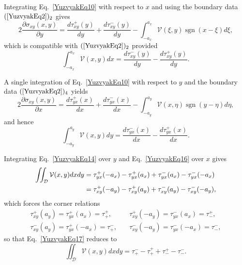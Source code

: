 Integrating Eq.~\eqref{YuzvyakEq10} with respect to \(x\) and using the
boundary data \((\ref{YuzvyakEq2})_2\) gives
\begin{equation}
	2\frac{\partial \sigma_{xy}(x,y)}{\partial y}=
	\frac{d\tau_{xy}^{+}(y)}{dy}+\frac{d\tau_{xy}^{-}(y)}{dy}
	-\int_{-a_x}^{a_x}\mathcal{V}(\xi,y) \operatorname{sgn}(x-\xi) d\xi ,
	\label{YuzvyakEq13}
\end{equation}
which is compatible with \((\ref{YuzvyakEq2})_2\) provided
\begin{equation}
	\int_{-a_x}^{a_x}\mathcal{V}(x,y) dx=
	\frac{d\tau_{xy}^{-}(y)}{dy}-\frac{d\tau_{xy}^{+}(y)}{dy}.
	\label{YuzvyakEq14}
\end{equation}

A single integration of Eq.~\eqref{YuzvyakEq10} with respect to \(y\) and
the boundary data \((\ref{YuzvyakEq2})_4\) yields
\begin{equation}
	2\frac{\partial \sigma_{xy}(x,y)}{\partial x}=
	\frac{d\tau_{yx}^{+}(x)}{dx}+\frac{d\tau_{yx}^{-}(x)}{dx}
	-\int_{-a_y}^{a_y}\mathcal{V}(x,\eta) \operatorname{sgn}(y-\eta) d\eta ,
	\label{YuzvyakEq15}
\end{equation}
and hence
\begin{equation}
	\int_{-a_y}^{a_y}\mathcal{V}(x,y) dy=
	\frac{d\tau_{yx}^{-}(x)}{dx}-\frac{d\tau_{yx}^{+}(x)}{dx}.
	\label{YuzvyakEq16}
\end{equation}

Integrating Eq.~\eqref{YuzvyakEq14} over \(y\) and Eq.~\eqref{YuzvyakEq16}
over \(x\) gives
\begin{align}
	\iint_{\mathcal{D}}\mathcal{V}(x,y) dx dy&=
	\tau_{yx}^{+}(-a_x)-\tau_{yx}^{+}(a_x)+\tau_{yx}^{-}(a_x)-\tau_{yx}^{-}(-a_x)
	\notag\\
	&=\tau_{xy}^{+}(-a_y)-\tau_{xy}^{+}(a_y)+\tau_{xy}^{-}(a_y)-\tau_{xy}^{-}(-a_y),
	\label{YuzvyakEq17}
\end{align}
which forces the corner relations
\begin{equation}\label{YuzvyakEq18}
	\begin{array}{ll}
	\tau_{xy}^{+}(a_y)=\tau_{yx}^{+}(a_x)=\tau_{+}^{+},&\quad
	\tau_{xy}^{+}(-a_y)=\tau_{yx}^{-}(a_x)=\tau_{-}^{+},\\
	\tau_{xy}^{-}(a_y)=\tau_{yx}^{+}(-a_x)=\tau_{+}^{-},&\quad
	\tau_{xy}^{-}(-a_y)=\tau_{yx}^{-}(-a_x)=\tau_{-}^{-},
	\end{array}	
\end{equation}
so that Eq.~\eqref{YuzvyakEq17} reduces to
\begin{equation}
	\iint_{\mathcal{D}}\mathcal{V}(x,y) dx dy=
	\tau_{+}^{-}-\tau_{+}^{+}+\tau_{-}^{+}-\tau_{-}^{-}.
	\label{YuzvyakEq19}
\end{equation}

